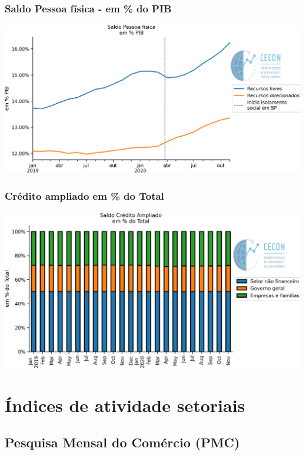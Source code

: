 \documentclass{SelfArx}
\begin{document}
\subsubsection*{Saldo Pessoa física - em \% do PIB}
\label{sec:org762a0c7}

\begin{center}
\includegraphics[width=.9\linewidth]{./figs/Credito/SaldoPF_PIB.png}
\end{center}


\subsubsection*{Crédito ampliado em \% do Total}
\label{sec:orga09477b}

\begin{center}
\includegraphics[width=.9\linewidth]{./figs/Credito/SaldoCreditoAmpliado_Total.png}
\end{center}



\section*{Índices de atividade setoriais}
\label{sec:org2313632}


\subsection*{Pesquisa Mensal do Comércio (PMC)}
\label{sec:org1787707}
\end{document}
